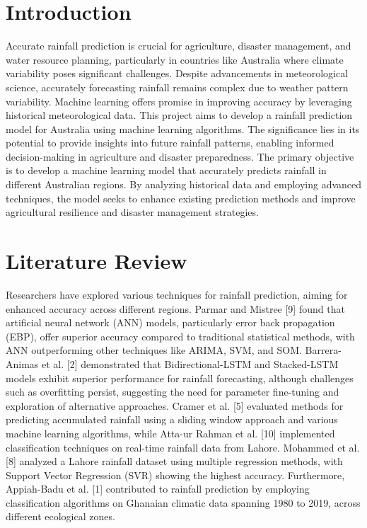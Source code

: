 \documentclass{josis}
\begin{document}
\section{Introduction}
Accurate rainfall prediction is crucial for agriculture, disaster management, and water resource planning, particularly in countries like Australia where climate variability poses significant challenges. Despite advancements in meteorological science, accurately forecasting rainfall remains complex due to weather pattern variability. Machine learning offers promise in improving accuracy by leveraging historical meteorological data. This project aims to develop a rainfall prediction model for Australia using machine learning algorithms. The significance lies in its potential to provide insights into future rainfall patterns, enabling informed decision-making in agriculture and disaster preparedness. The primary objective is to develop a machine learning model that accurately predicts rainfall in different Australian regions. By analyzing historical data and employing advanced techniques, the model seeks to enhance existing prediction methods and improve agricultural resilience and disaster management strategies.

\section{Literature Review}
Researchers have explored various techniques for rainfall prediction, aiming for enhanced accuracy across different regions. Parmar and Mistree [9] found that artificial neural network (ANN) models, particularly error back propagation (EBP), offer superior accuracy compared to traditional statistical methods, with ANN outperforming other techniques like ARIMA, SVM, and SOM. Barrera-Animas et al. [2] demonstrated that Bidirectional-LSTM and Stacked-LSTM models exhibit superior performance for rainfall forecasting, although challenges such as overfitting persist, suggesting the need for parameter fine-tuning and exploration of alternative approaches. Cramer et al. [5] evaluated methods for predicting accumulated rainfall using a sliding window approach and various machine learning algorithms, while Atta-ur Rahman et al. [10] implemented classification techniques on real-time rainfall data from Lahore. Mohammed et al. [8] analyzed a Lahore rainfall dataset using multiple regression methods, with Support Vector Regression (SVR) showing the highest accuracy. Furthermore, Appiah-Badu et al. [1] contributed to rainfall prediction by employing classification algorithms on Ghanaian climatic data spanning 1980 to 2019, across different ecological zones.
\end{document}
